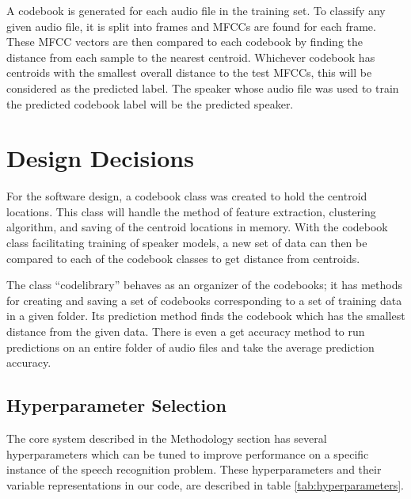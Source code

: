 \documentclass[conference]{IEEEtran}
\begin{document}
A codebook is generated for each audio file in the training set. To classify any given audio file, it is split into frames and MFCCs are found for each frame. These MFCC vectors are then compared to each codebook by finding the distance from each sample to the nearest centroid. Whichever codebook has centroids with the smallest overall distance to the test MFCCs, this will be considered as the predicted label. The speaker whose audio file was used to train the predicted codebook label will be the predicted speaker.


\section{Design Decisions}
For the software design, a codebook class was created to hold the centroid locations. This class will handle the method of feature extraction, clustering algorithm, and saving of the centroid locations in memory. With the codebook class facilitating training of speaker models, a new set of data can then be compared to each of the codebook classes to get distance from centroids.

The class “codelibrary” behaves as an organizer of the codebooks; it has methods for creating and saving a set of codebooks corresponding to a set of training data in a given folder. Its prediction method finds the codebook which has the smallest distance from the given data. There is even a get accuracy method to run predictions on an entire folder of audio files and take the average prediction accuracy.

\subsection{Hyperparameter Selection}
The core system described in the Methodology section has several hyperparameters which can be tuned to improve performance on a specific instance of the speech recognition problem. These hyperparameters and their variable representations in our code, are described in table \ref{tab:hyperparameters}.
\end{document}
